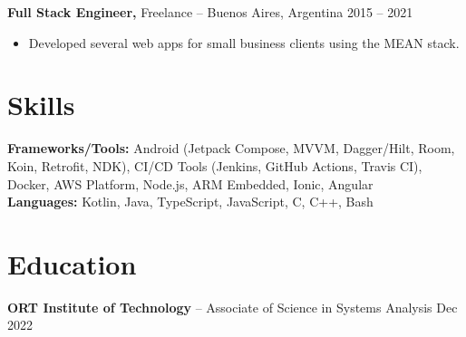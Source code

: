 \documentclass[11pt]{article}       %
\begin{document}
\vspace{3pt}

\textbf{Full Stack Engineer,} {Freelance} -- Buenos Aires, Argentina \hfill 2015 -- 2021 \\
\vspace{-6pt}
\begin{itemize}
  \item Developed several web apps for small business clients using the MEAN stack.
\end{itemize}

\section*{Skills}

\textbf{Frameworks/Tools:} Android (Jetpack Compose, MVVM, Dagger/Hilt, Room, Koin, Retrofit, NDK), CI/CD Tools (Jenkins, GitHub Actions, Travis CI), Docker, AWS Platform, Node.js, ARM Embedded, Ionic, Angular \\
\textbf{Languages:} Kotlin, Java, TypeScript, JavaScript, C, C++, Bash

\section*{Education}

\textbf{ORT Institute of Technology} -- Associate of Science in Systems Analysis \hfill Dec 2022 \\
\end{document}
